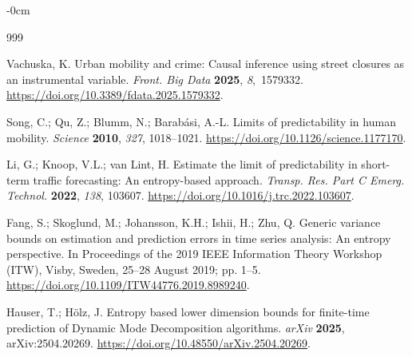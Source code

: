 \documentclass[applsci,article,accept,moreauthors]{Definitions/mdpi}
\begin{document}
\begin{adjustwidth}{-\extralength}{0cm}
\begin{thebibliography}{999}

Vachuska, K. Urban mobility and crime: Causal inference using street closures as an instrumental variable. \emph{Front. Big Data} \textbf{2025}, \emph{8},~1579332. \url{https://doi.org/10.3389/fdata.2025.1579332}.





Song, C.; Qu, Z.; Blumm, N.; Barab\'asi, A.-L. Limits of predictability
in human mobility. \emph{Science} \textbf{2010}, \emph{327}, 1018--1021.
\url{https://doi.org/10.1126/science.1177170}.

Li, G.; Knoop, V.L.; van Lint, H. Estimate the limit of predictability in
short-term traffic forecasting: An entropy-based approach.
\emph{Transp. Res. Part C Emerg. Technol.} \textbf{2022}, \emph{138},
103607. \url{https://doi.org/10.1016/j.trc.2022.103607}.

Fang, S.; Skoglund, M.; Johansson, K.H.; Ishii, H.; Zhu, Q.
Generic variance bounds on estimation and prediction errors in time series
analysis: An entropy perspective. In {Proceedings of the 2019 IEEE
Information Theory Workshop (ITW)}, Visby, Sweden, 25--28 August 2019;
pp. 1--5. \url{https://doi.org/10.1109/ITW44776.2019.8989240}.


Hauser, T.; H\"olz, J. Entropy based lower dimension bounds for finite-time
prediction of Dynamic Mode Decomposition algorithms. \emph{arXiv}
\textbf{2025}, arXiv:2504.20269. %
\url{https://doi.org/10.48550/arXiv.2504.20269}.


\end{thebibliography}
\end{adjustwidth}
\end{document}
